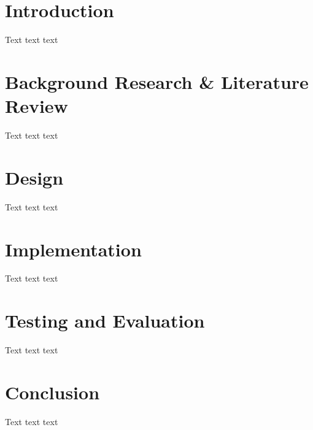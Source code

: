 \documentclass[12pt]{article}
\begin{document}
\clearpage
\singlespacing
\tableofcontents  %
\listoffigures    %
\listoftables     %
\listofalgorithms %
\clearpage
\onehalfspacing

\section{Introduction}
Text text text 

\section{Background Research \& Literature Review}
Text text text

\section{Design}
Text text text

\section{Implementation}
Text text text

\section{Testing and Evaluation}
Text text text

\section{Conclusion}
Text text text


\clearpage
{}
\singlespacing %
\printbibliography
\end{document}
